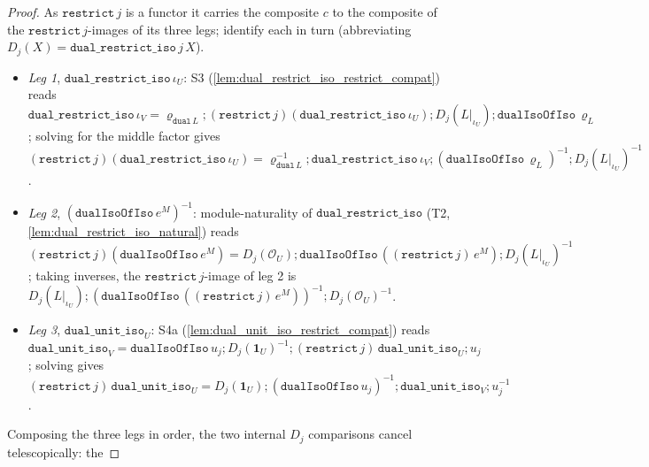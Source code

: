 \begin{proof}
  \leanok
  As \(\mathtt{restrict}\,j\) is a functor it carries the composite \(c\) to the composite of the
  \(\mathtt{restrict}\,j\)-images of its three legs; identify each in turn (abbreviating
  \(D_j(X) = \mathtt{dual\_restrict\_iso}\,j\,X\)).
  \begin{itemize}
    \item \emph{Leg 1}, \(\mathtt{dual\_restrict\_iso}\,\iota_U\): S3
      (\cref{lem:dual_restrict_iso_restrict_compat}) reads
      \(\mathtt{dual\_restrict\_iso}\,\iota_V = \varrho_{\mathtt{dual}\,L}
        \mathbin{;} (\mathtt{restrict}\,j)(\mathtt{dual\_restrict\_iso}\,\iota_U)
        \mathbin{;} D_j(L|_{\iota_U}) \mathbin{;} \mathtt{dualIsoOfIso}\,\varrho_L\);
      solving for the middle factor gives
      \((\mathtt{restrict}\,j)(\mathtt{dual\_restrict\_iso}\,\iota_U)
        = \varrho_{\mathtt{dual}\,L}^{-1} \mathbin{;} \mathtt{dual\_restrict\_iso}\,\iota_V
          \mathbin{;} (\mathtt{dualIsoOfIso}\,\varrho_L)^{-1} \mathbin{;} D_j(L|_{\iota_U})^{-1}\).
    \item \emph{Leg 2}, \((\mathtt{dualIsoOfIso}\,e^M)^{-1}\): module-naturality of
      \(\mathtt{dual\_restrict\_iso}\) (T2, \cref{lem:dual_restrict_iso_natural}) reads
      \((\mathtt{restrict}\,j)(\mathtt{dualIsoOfIso}\,e^M)
        = D_j(\mathcal O_U) \mathbin{;} \mathtt{dualIsoOfIso}\,((\mathtt{restrict}\,j)\,e^M)
          \mathbin{;} D_j(L|_{\iota_U})^{-1}\);
      taking inverses, the \(\mathtt{restrict}\,j\)-image of leg 2 is
      \(D_j(L|_{\iota_U}) \mathbin{;} (\mathtt{dualIsoOfIso}\,((\mathtt{restrict}\,j)\,e^M))^{-1}
        \mathbin{;} D_j(\mathcal O_U)^{-1}\).
    \item \emph{Leg 3}, \(\mathtt{dual\_unit\_iso}_U\): S4a
      (\cref{lem:dual_unit_iso_restrict_compat}) reads
      \(\mathtt{dual\_unit\_iso}_V = \mathtt{dualIsoOfIso}\,u_j \mathbin{;} D_j(\mathbf 1_U)^{-1}
        \mathbin{;} (\mathtt{restrict}\,j)\,\mathtt{dual\_unit\_iso}_U \mathbin{;} u_j\);
      solving gives \((\mathtt{restrict}\,j)\,\mathtt{dual\_unit\_iso}_U
        = D_j(\mathbf 1_U) \mathbin{;} (\mathtt{dualIsoOfIso}\,u_j)^{-1}
          \mathbin{;} \mathtt{dual\_unit\_iso}_V \mathbin{;} u_j^{-1}\).
  \end{itemize}
  Composing the three legs in order, the two internal \(D_j\) comparisons cancel telescopically: the

\end{proof}
